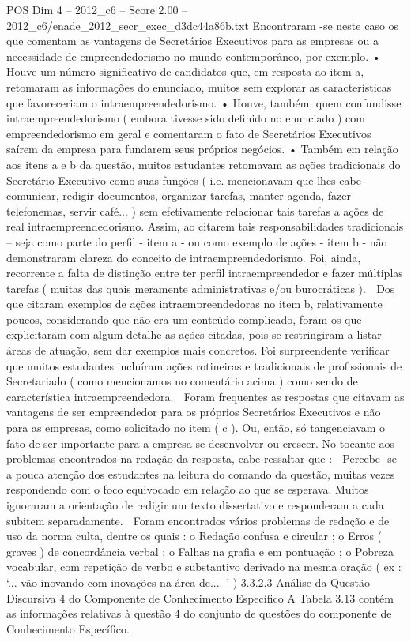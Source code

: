 \begin{textsample}{POS Dim 4 – 2012\_c6 – Score 2.00 – 2012\_c6/enade\_2012\_secr\_exec\_d3dc44a86b.txt}
Encontraram -se neste caso os que comentam as vantagens de Secretários Executivos para as empresas ou a necessidade de empreendedorismo no mundo contemporâneo, por exemplo. • Houve um número significativo de candidatos que, em resposta ao item a, retomaram as informações do enunciado, muitos sem explorar as características que favoreceriam o intraempreendedorismo. • Houve, também, quem confundisse intraempreendedorismo ( embora tivesse sido definido no enunciado ) com empreendedorismo em geral e comentaram o fato de Secretários Executivos saírem da empresa para fundarem seus próprios negócios. • Também em relação aos itens a e b da questão, muitos estudantes retomavam as ações tradicionais do Secretário Executivo como suas funções ( i.e. mencionavam que lhes cabe comunicar, redigir documentos, organizar tarefas, manter agenda, fazer telefonemas, servir café... ) sem efetivamente relacionar tais tarefas a ações de real intraempreendedorismo.
Assim, ao citarem tais responsabilidades tradicionais – seja como parte do perfil - item a - ou como exemplo de ações - item b - não demonstraram clareza do conceito de intraempreendedorismo.
Foi, ainda, recorrente a falta de distinção entre ter perfil intraempreendedor e fazer múltiplas tarefas ( muitas das quais meramente administrativas e/ou burocráticas ).  Dos que citaram exemplos de ações intraempreendedoras no item b, relativamente poucos, considerando que não era um conteúdo complicado, foram os que explicitaram com algum detalhe as ações citadas, pois se restringiram a listar áreas de atuação, sem dar exemplos mais concretos.
Foi surpreendente verificar que muitos estudantes incluíram ações rotineiras e tradicionais de profissionais de Secretariado ( como mencionamos no comentário acima ) como sendo de característica intraempreendedora.  Foram frequentes as respostas que citavam as vantagens de ser empreendedor para os próprios Secretários Executivos e não para as empresas, como solicitado no item ( c ).
Ou, então, só tangenciavam o fato de ser importante para a empresa se desenvolver ou crescer.
No tocante aos problemas encontrados na redação da resposta, cabe ressaltar que :  Percebe -se a pouca atenção dos estudantes na leitura do comando da questão, muitas vezes respondendo com o foco equivocado em relação ao que se esperava.
Muitos ignoraram a orientação de redigir um texto dissertativo e responderam a cada subitem separadamente.  Foram encontrados vários problemas de redação e de uso da norma culta, dentre os quais : o Redação confusa e circular ; o Erros ( graves ) de concordância verbal ; o Falhas na grafia e em pontuação ; o Pobreza vocabular, com repetição de verbo e substantivo derivado na mesma oração ( ex : ‘... vão inovando com inovações na área de.... ’ ) 3.3.2.3 Análise da Questão Discursiva 4 do Componente de Conhecimento Específico A Tabela 3.13 contém as informações relativas à questão 4 do conjunto de questões do componente de Conhecimento Específico.

\end{textsample}
